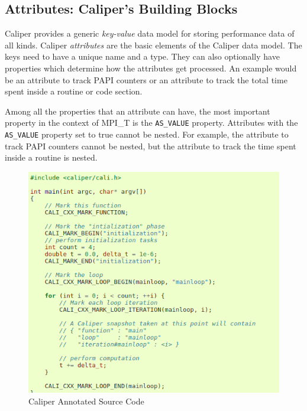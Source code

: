 \subsection{Attributes: Caliper's Building Blocks}
Caliper provides a generic \textit{key-value} data model for storing performance data of all kinds. Caliper \textit{attributes} are the basic elements of the Caliper data model. The keys need to have a unique name and a type. They can also optionally have properties which determine how the attributes get processed. An example would be an attribute to track PAPI counters or an attribute to track the total time spent inside a routine or code section. 
\par Among all the properties that an attribute can have, the most important property in the context of MPI\_T is the \verb+AS_VALUE+ property. Attributes with the \verb+AS_VALUE+ property set to true cannot be nested. For example, the attribute to track PAPI counters cannot be nested, but the attribute to track the time spent inside a routine is nested.
\begin{center}
	\begin{figure}[tbp!]
         \centering
  \captionsetup{justification=centering}
		\includegraphics[scale=0.3, width=\columnwidth, keepaspectratio]{figures/cali-example}
		\caption{Caliper Annotated Source Code}
		\label{fig:caliexample}
	\end{figure}
\end{center}

